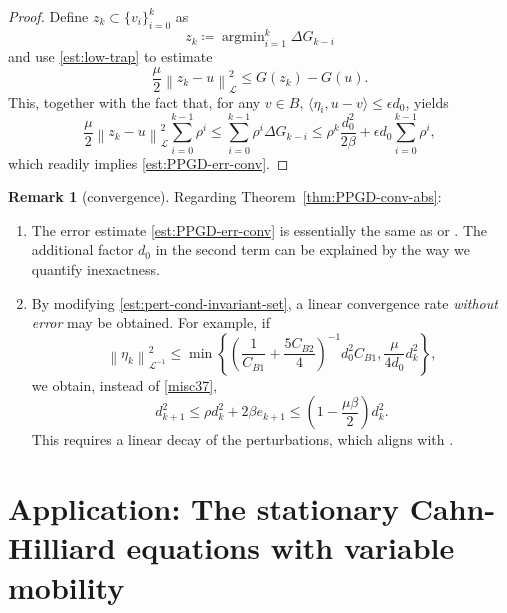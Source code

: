 \documentclass{amsart}
\DeclareMathOperator*{\argmin}{argmin}
\newcommand{\vkp}{{v_{k+1}}}
\newcommand{\etak}{{\eta_{k}}}
\newcommand{\LL}{\mathcal{L}}
\newcommand{\LLinv}{{\mathcal{L}^{-1}}}
\newcommand{\norm}[2]{\left\| #1 \right\| _{#2}}
\newcommand{\pairing}[2]{\bigl\langle #1 , #2 \bigr\rangle}
\newcommand{\s}{{\beta}}	%
\newcommand{\CdvB}{{C_{B1}}} %
\newcommand{\CddB}{{C_{B2}}} %
\theoremstyle{definition}
\newtheorem{rmk}[thm]{Remark}
\begin{document}
\begin{proof}
	Define $z_k \subset \{v_i\}_{i=0}^k$ as
	\[ 
	  z_k \coloneqq \argmin_{i=1}^k \Delta G_{k-i}
	\]
  and use \eqref{est:low-trap} to estimate
  \[
    \frac\mu2 \norm{z_k - u}{\LL}^2 \le G(z_k)-G(u).
  \]
  This, together with the fact that, for any $v \in B$, $\langle \eta_i, u - v \rangle \leq \epsilon d_0$, yields
	\begin{equation*}
		\frac{\mu}{2}\norm{z_k - u}{\LL}^2\sum_{i=0}^{k-1} \rho^i   \le \sum_{i=0}^{k-1} \rho^i  \Delta G_{k-i} \le \rho^{k} \frac{d_{0}^2}{2\s} +  \epsilon d_0 \sum_{i=0}^{k-1} \rho^i ,
	\end{equation*}
	which readily implies \eqref{est:PPGD-err-conv}.
\end{proof}

\begin{rmk}[convergence]
  Regarding Theorem~\ref{thm:PPGD-conv-abs}:
	\begin{enumerate}[1.]
		\item The error estimate \eqref{est:PPGD-err-conv} is essentially the same as \cite[p.~10 Thm.~4]{devolder2013strongconv} or \cite[p.~156 Thm.~5.4]{devolder2013exactness}. The additional factor $d_0$ in the second term can be explained by the way we quantify inexactness.
 
	\item By modifying \eqref{est:pert-cond-invariant-set}, a linear convergence rate \emph{without error} may be obtained. For example, if 
	\begin{equation*}
		\norm{\eta_{k}}{\LLinv}^2
		\le \min\left\{
		\left(\frac{1}{\CdvB} +\frac{5\CddB}{4} \right)^{-1} d_0^2 \CdvB, \frac{\mu}{4d_0} d_k^2  \right\},
	\end{equation*}
	we obtain, instead of \eqref{misc37},
		\begin{equation*}
      d_{k+1}^2 \le \rho d_{k}^2 +  2\s e_{k+1} \le \left( 1-\frac{\mu\s}{2} \right)d_k^2.
	\end{equation*}
	This requires a linear decay of the perturbations, which aligns with \cite{schmidt2011convergence}. 
	\end{enumerate}
\end{rmk}

\section{Application: The stationary Cahn-Hilliard equations with variable mobility}\label{sec:app-to-CHeqn}
\end{document}

